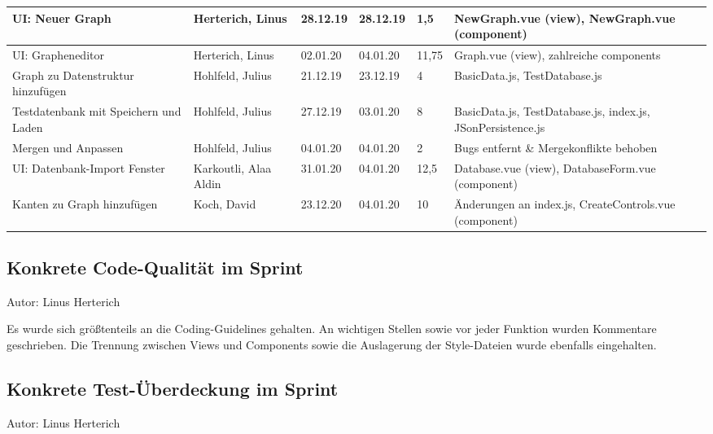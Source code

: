 \begin{longtable}{|p{4cm}|p{2cm}|p{1.2cm}|p{1.2cm}|p{0.7cm}|p{3.8cm}|}
  UI: Neuer Graph                                                       & Herterich, Linus      & 28.12.19 & 28.12.19 & 1,5   & NewGraph.vue (view), NewGraph.vue (component)               \\ \hline
  UI: Grapheneditor                                                     & Herterich, Linus      & 02.01.20 & 04.01.20 & 11,75 & Graph.vue (view), zahlreiche components                     \\ \hline
  Graph zu Datenstruktur hinzufügen                                     & Hohlfeld, Julius      & 21.12.19 & 23.12.19 & 4     & BasicData.js, TestDatabase.js                               \\ \hline
  Testdatenbank mit Speichern und Laden                                 & Hohlfeld, Julius      & 27.12.19 & 03.01.20 & 8     & BasicData.js, TestDatabase.js, index.js, JSonPersistence.js \\ \hline
  Mergen und Anpassen                                                   & Hohlfeld, Julius      & 04.01.20 & 04.01.20 & 2     & Bugs entfernt \& Mergekonflikte behoben                     \\ \hline
  UI: Datenbank-Import Fenster                                          & Karkoutli, Alaa Aldin & 31.01.20 & 04.01.20 & 12,5  & Database.vue (view), DatabaseForm.vue (component)           \\ \hline
  Kanten zu Graph hinzufügen                                            & Koch, David           & 23.12.20 & 04.01.20 & 10    & Änderungen an index.js, CreateControls.vue (component)      \\ \hline
\end{longtable}

\subsection{Konkrete Code-Qualität im Sprint}
{\small Autor: Linus Herterich}

Es wurde sich größtenteils an die Coding-Guidelines gehalten. An wichtigen Stellen sowie vor jeder Funktion wurden Kommentare
geschrieben. Die Trennung zwischen Views und Components sowie die Auslagerung der Style-Dateien wurde ebenfalls eingehalten.

\subsection{Konkrete Test-Überdeckung im Sprint}
{\small Autor: Linus Herterich}

